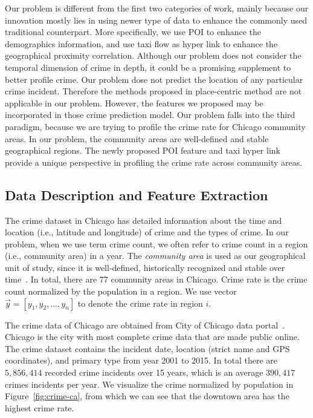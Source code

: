 Our problem is different from the first two categories of work, mainly because our innovation mostly lies in using newer type of data to enhance the commonly used traditional counterpart. More specifically, we use POI to enhance the demographics information, and use taxi flow as hyper link to enhance the geographical proximity correlation. Although our problem does not consider the temporal dimension of crime in depth, it could be a promising supplement to better profile crime. Our problem dose not predict the location of any particular crime incident. Therefore the methods proposed in place-centric method are not applicable in our problem. However, the features we proposed may be incorporated in those crime prediction model. 
Our problem falls into the third paradigm,  because we are trying to profile the crime rate for Chicago community areas. In our problem, the community areas are well-defined and stable geographical regions. The newly proposed POI feature and taxi hyper link provide a unique perspective in profiling the crime rate across community areas.




\subsection{Data Description and Feature Extraction}

The crime dataset in Chicago has detailed information about the time and location (i.e., latitude and longitude) of crime and the types of crime. In our problem, when we use term crime count, we often refer to crime count in a  region (i.e., community area) in a year. The \emph{community area} is used as our geographical unit of study, since it is well-defined,  historically recognized and stable over time~\cite{wiki-ca}. In total, there are 77 community areas in Chicago.  Crime rate is the crime count normalized by the population in a region. We use vector $\vec{y} = [y_1, y_2, \ldots, y_n]$ to denote the crime rate in region $i$.


The crime data of Chicago are obtained from City of Chicago data portal~\cite{crime-data}. Chicago is the city with most complete crime data that are made public online. The crime dataset contains the incident date, location (strict name and GPS coordinates), and primary type from year 2001 to 2015. In total there are $5,856,414$ recorded crime incidents over 15 years, which is an average $390,417$ crimes incidents per year. We visualize the crime normalized by population in Figure~\ref{fig:crime-ca}, from which we can see that the downtown area has the highest crime rate.

